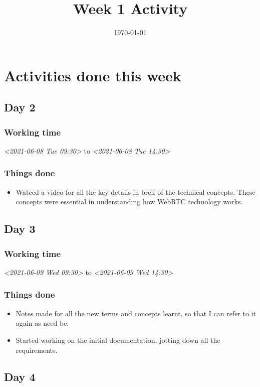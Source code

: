 \documentclass[11pt]{article}
\date{\today}
\title{Week 1 Activity}
\begin{document}
\maketitle
\section*{Activities done this week}
\label{sec:org6a54064}
\subsection*{Day 2}
\label{sec:orge570dfe}
\subsubsection*{Working time}
\label{sec:orgc1f9d39}
\textit{<2021-06-08 Tue 09:30> } to \textit{<2021-06-08 Tue 14:30>}
\subsubsection*{Things done}
\label{sec:org40645d5}
\begin{itemize}
\item Watced a video for  all the key details in breif of the technical concepts. These concepts were essential in understanding how WebRTC technology works.
\end{itemize}

\subsection*{Day 3}
\label{sec:org7d8487d}
\subsubsection*{Working time}
\label{sec:orgaa7bbad}
\textit{<2021-06-09 Wed 09:30> } to \textit{<2021-06-09 Wed 14:30>}
\subsubsection*{Things done}
\label{sec:orgb3ba90b}
\begin{itemize}
\item Notes made for all the new terms and concepts learnt, so that I can refer to it again as need be.
\item Started working on the initial documentation, jotting down all the requirements.
\end{itemize}

\subsection*{Day 4}
\label{sec:org8686365}
\end{document}
